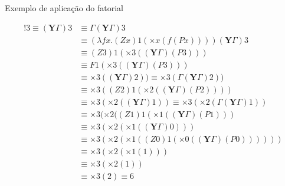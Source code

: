 \begin{frame}[fragile]{Exemplo de aplicação do fatorial}

    \begin{align*}
        !3 \equiv (\mathbf{Y}\Gamma )3 &\equiv \Gamma (\mathbf{Y}\Gamma )3 \\
        &\equiv (\lambda fx.(Zx)1(\times x(f(Px))))(\mathbf{Y}\Gamma )3 \\
        &\equiv (Z3)1(\times 3((\mathbf{Y}\Gamma )(P3))) \\
        &\equiv F1(\times 3((\mathbf{Y}\Gamma )(P3))) \\
        &\equiv \times 3((\mathbf{Y}\Gamma )2)) \equiv \times 3(\Gamma (\mathbf{Y}\Gamma )2)) \\
        &\equiv \times 3((Z2)1(\times 2((\mathbf{Y}\Gamma )(P2)))) \\
        &\equiv \times 3(\times 2((\mathbf{Y}\Gamma )1)) \equiv \times 3(\times 2(\Gamma (\mathbf{Y}\Gamma )1)) \\
        &\equiv \times 3(\times 2((Z1)1(\times 1((\mathbf{Y}\Gamma )(P1))) \\
        &\equiv \times 3(\times 2(\times 1((\mathbf{Y}\Gamma )0))) \\
        &\equiv \times 3(\times 2(\times 1((Z0)1(\times 0((\mathbf{Y}\Gamma )(P0)))))) \\
        &\equiv \times 3(\times 2(\times 1(1))) \\
        &\equiv \times 3(\times 2(1)) \\
        &\equiv \times 3(2) \equiv 6
    \end{align*}

\end{frame}
